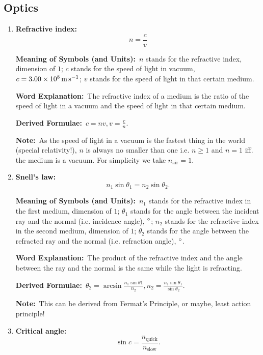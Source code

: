 \documentclass[8pt]{article}
\newcommand{\MeanSymb}{\textbf{Meaning of Symbols (and Units):}\ }
\newcommand{\WordExpl}{\textbf{Word Explanation:}\ }
\newcommand{\DeriForm}{\textbf{Derived Formulae:}\ }
\newcommand{\Note}{\textbf{Note:}\ }
\begin{document}
        \subsection{Optics}
            \begin{enumerate}
                \item \textbf{Refractive index:}
                \[
                    n = \frac{c}{v}
                \]

                \MeanSymb \(n\) stands for the refractive index, dimension of \(1\); \(c\) stands for the speed of light in vacuum, \(c = \qty{3.00 e 8}{\metre \per \second}\); \(v\) stands for the speed of light in that certain medium.

                \WordExpl The refractive index of a medium is the ratio of the speed of light in a vacuum and the speed of light in that certain medium.

                \DeriForm \(c = nv, v = \frac{c}{n}\).

                \Note As the speed of light in a vacuum is the fastest thing in the world (special relativity!), \(n\) is always no smaller than one i.e. \(n \geq 1\) and \(n = 1\) iff. the medium is a vacuum. For simplicity we take \(n_{\text{air}} = 1\).
                
                \item \textbf{Snell's law:}
                \[
                    n_1 \sin \theta_1 = n_2 \sin \theta_2.
                \]

                \MeanSymb \(n_1\) stands for the refractive index in the first medium, dimension of \(1\); \(\theta_1\) stands for the angle between the incident ray and the normal (i.e. incidence angle), \(^\circ\); \(n_2\) stands for the refractive index in the second medium, dimension of \(1\); \(\theta_2\) stands for the angle between the refracted ray and the normal (i.e. refraction angle), \(^\circ\).

                \WordExpl The product of the refractive index and the angle between the ray and the normal is the same while the light is refracting.

                \DeriForm \(\theta_2 = \arcsin \frac{n_1 \sin \theta 1}{n_2}, n_2 = \frac{n_1 \sin \theta_1}{\sin\theta_2}\).

                \Note This can be derived from Fermat's Principle, or maybe, least action principle!
                
                \item \textbf{Critical angle:}
                \[
                    \sin c = \frac{n_{\text{quick}}}{n_{\text{slow}}}.
                \]


\end{enumerate}
\end{document}

